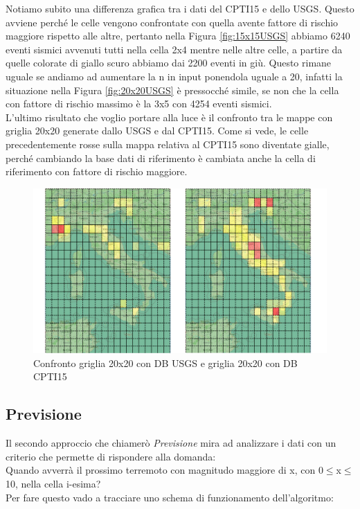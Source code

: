 Notiamo subito una differenza grafica tra i dati del CPTI15 e dello USGS. Questo avviene perch\'e le celle vengono confrontate con quella avente fattore di rischio maggiore rispetto alle altre, pertanto nella Figura \ref{fig:15x15USGS} abbiamo 6240 eventi sismici avvenuti tutti nella cella 2x4 mentre nelle altre celle, a partire da quelle colorate di giallo scuro abbiamo dai 2200 eventi in gi\`u. Questo rimane uguale se andiamo ad aumentare la n in input ponendola uguale a 20, infatti la situazione nella Figura \ref{fig:20x20USGS} \`e pressocch\'e simile, se non che la cella con fattore di rischio massimo \`e la 3x5 con 4254 eventi sismici.\\
L'ultimo risultato che voglio portare alla luce \`e il confronto tra le mappe con griglia 20x20 generate dallo USGS e dal CPTI15. Come si vede, le celle precedentemente rosse sulla mappa relativa al CPTI15 sono diventate gialle, perch\'e cambiando la base dati di riferimento \`e cambiata anche la cella di riferimento con fattore di rischio maggiore.

\begin{figure}[H]
   \centering
   \includegraphics[width=1.0\textwidth]{images/20x20_USGS_vs_CPTI15.jpg}
   \caption{Confronto griglia 20x20 con DB USGS e griglia 20x20 con DB CPTI15}
\end{figure}

\subsection{Previsione}
Il secondo approccio che chiamer\`o \textit{Previsione} mira ad analizzare i dati con un criterio che permette di rispondere alla domanda:\\
Quando avverr\`a il prossimo terremoto con magnitudo maggiore di x, con 0$\le$x$\le$10, nella cella i-esima?\\
Per fare questo vado a tracciare uno schema di funzionamento dell'algoritmo:

